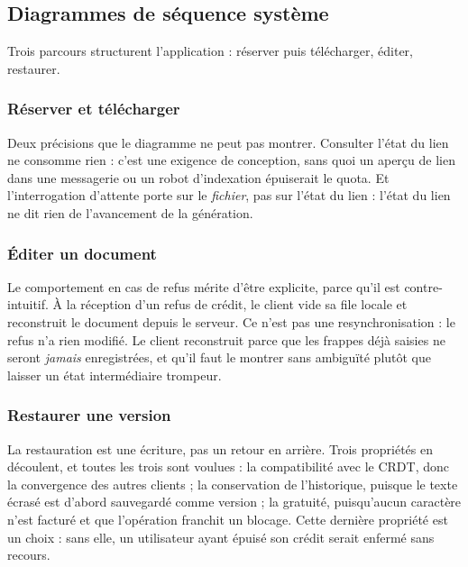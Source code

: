 \subsection{Diagrammes de séquence système}

Trois parcours structurent l'application : réserver puis télécharger, éditer,
restaurer.

\subsubsection{Réserver et télécharger}


Deux précisions que le diagramme ne peut pas montrer. Consulter l'état du lien
ne consomme rien : c'est une exigence de conception, sans quoi un aperçu de lien
dans une messagerie ou un robot d'indexation épuiserait le quota. Et
l'interrogation d'attente porte sur le \emph{fichier}, pas sur l'état du lien :
l'état du lien ne dit rien de l'avancement de la génération.

\subsubsection{Éditer un document}


Le comportement en cas de refus mérite d'être explicite, parce qu'il est
contre-intuitif. À la réception d'un refus de crédit, le client vide sa file
locale et reconstruit le document depuis le serveur. Ce n'est pas une
resynchronisation : le refus n'a rien modifié. Le client reconstruit parce que
les frappes déjà saisies ne seront \emph{jamais} enregistrées, et qu'il faut le
montrer sans ambiguïté plutôt que laisser un état intermédiaire trompeur.

\subsubsection{Restaurer une version}


La restauration est une écriture, pas un retour en arrière. Trois propriétés en
découlent, et toutes les trois sont voulues : la compatibilité avec le CRDT, donc
la convergence des autres clients ; la conservation de l'historique, puisque le
texte écrasé est d'abord sauvegardé comme version ; la gratuité, puisqu'aucun
caractère n'est facturé et que l'opération franchit un blocage. Cette dernière
propriété est un choix : sans elle, un utilisateur ayant épuisé son crédit serait
enfermé sans recours.

